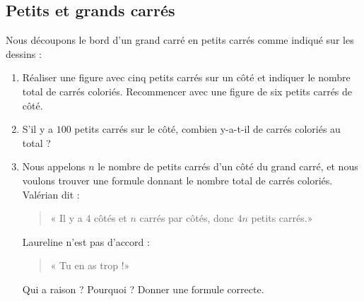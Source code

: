 
\subsection*{Petits et grands carrés}

Nous découpons le bord d'un grand carré en petits carrés comme indiqué sur les dessins :


\begin{center}
    
\end{center}

\begin{enumerate}
    \item
Réaliser une figure avec cinq petits carrés sur un côté et indiquer le nombre total de carrés coloriés. Recommencer avec une figure de six petits carrés de côté.

\item
S'il y a $100$ petits carrés sur le côté, combien y-a-t-il de carrés coloriés au total ?
\item
    Nous appelons \( n\) le nombre de petits carrés d'un côté du grand carré, et nous voulons trouver une formule donnant le nombre total de carrés coloriés. Valérian dit :
    \begin{quote}
        « Il y a \( 4\) côtés et \( n\) carrés par côtés, donc \( 4n\) petits carrés.» 
    \end{quote}
    Laureline n'est pas d'accord :
    \begin{quote}
       « Tu en as trop !»
    \end{quote}
    Qui a raison ? Pourquoi ? Donner une formule correcte.
\end{enumerate}
